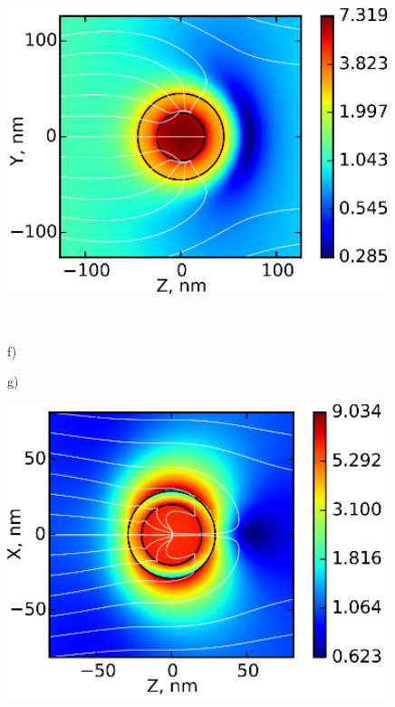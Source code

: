 \documentclass[aip,jap,reprint]{revtex4-1}
\begin{document}
\begin{figure}[!h]
\begin{minipage}[h]{0.235\textwidth}
  \end{minipage}
  \hfill
  \begin{minipage}[h]{0.235\textwidth}
    \includegraphics[width=0.99\textwidth]{3e}
  \end{minipage}\\
  \vspace{4pt}
  \begin{minipage}[h]{0.235\textwidth}
    \begin{flushleft}
      f)
    \end{flushleft}
  \end{minipage}
  \hfill
  \begin{minipage}[h]{0.235\textwidth}
    \begin{flushleft}
      g)
    \end{flushleft}
  \end{minipage}
  \begin{minipage}[h]{0.235\textwidth}
    \includegraphics[width=0.99\textwidth]{3f}

\end{minipage}
\end{figure}
\end{document}
